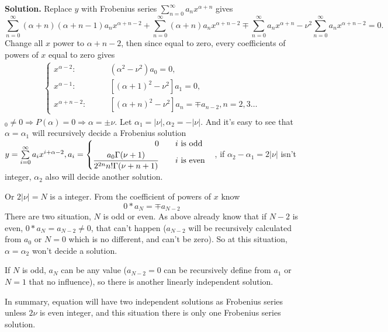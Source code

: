 \documentclass[a4paper]{book}
\newenvironment{solution}%
{\noindent\textbf{Solution.}}%
{\qedhere}
\numberwithin{equation}{chapter}
\theoremstyle{definition}
\begin{document}
\begin{solution}
  Replace $y$ with Frobenius series $\sum_{n=0}^\infty a_n x^{\alpha + n}$ gives
  \[\sum\limits_{n = 0}^{\infty} (\alpha + n)(\alpha + n - 1) a_n x^{\alpha + n - 2} + \sum\limits_{n=0}^\infty (\alpha + n) a_n x^{\alpha + n -2} \mp \sum\limits_{n=0}^\infty a_n x^{\alpha+n} - \nu^2 \sum\limits_{n=0}^\infty a_n x^{\alpha + n - 2} = 0.\]
  Change all $x$ power to $\alpha + n - 2$, then since equal to zero, every coefficients of powers of $x$ equal to zero gives
  \begin{align*}
    \begin{cases}
      x^{\alpha - 2}:\qquad & (\alpha^2 - \nu^2)a_0 = 0, \\
      x^{\alpha - 1}:\qquad & [(\alpha+1)^2 - \nu^2]a_1 = 0, \\
      x^{\alpha +n -2}: \qquad & [(\alpha+n)^2 - \nu^2]a_{n} = \mp a_{n-2},  n = 2,3\ldots  
    \end{cases}
  \end{align*}
  $_0 \not= 0 \Rightarrow P(\alpha) = 0 \Rightarrow \alpha = \pm \nu$. Let $\alpha_1 = \left| \nu \right|, \alpha_2 = -\left| \nu \right|$. And it's easy to see that $\alpha = \alpha_1$ will recursively decide a Frobenius solution $y = \sum\limits_{i = 0}^{\infty}a_i x^{i + \alpha - 2}, a_i =
  \begin{cases}
    \begin{aligned}
      0 \qquad  &i \textmd{ is odd} \\
      \frac{a_0\Gamma(\nu + 1)}{2^{2n} n! \Gamma(\nu + n + 1)}\qquad & i \textmd{ is even}
    \end{aligned}
  \end{cases}
  $, if $\alpha_2 - \alpha_1 = 2\left| \nu \right|$ isn't integer, $\alpha_2$ also will decide another solution.

  Or $2\left| \nu \right| = N$ is a integer. From the coefficient of powers of $x$ know
  \[0 * a_N = \mp a_{N-2}\]
  There are two situation, $N$ is odd or even. As above already know that if $N-2$ is even, $ 0* a_N = a_{N-2} \not= 0$, that can't happen ($a_{N-2}$ will be recursively calculated from $a_0$ or $N = 0$ which is no different, and can't be zero). So at this situation, $\alpha = \alpha_2$ won't decide a solution.

  If $N$ is odd, $a_N$ can be any value ($a_{N-2} = 0$ can be recursively define from $a_1$ or $N = 1$ that no influence), so there is another linearly independent solution.

  In summary, equation will have two independent solutions as Frobenius series unless $2\nu$ is even integer, and this situation there is only one Frobenius series solution.

\end{solution}
\end{document}
